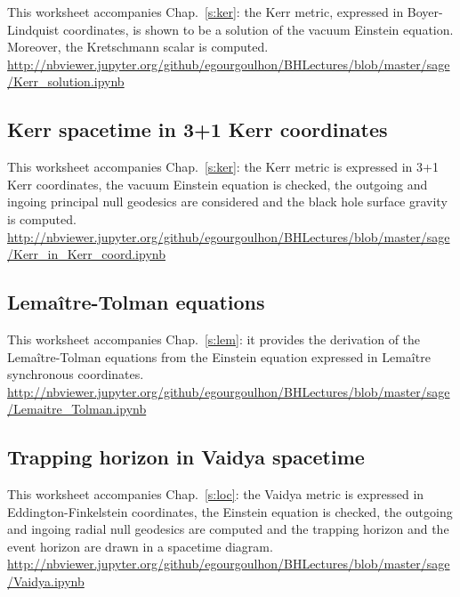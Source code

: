 This worksheet accompanies Chap.~\ref{s:ker}: the Kerr metric, expressed in Boyer-Lindquist
coordinates, is shown to be a solution of the vacuum Einstein equation. Moreover, the Kretschmann scalar is computed.\\[1ex]
{\footnotesize
\url{http://nbviewer.jupyter.org/github/egourgoulhon/BHLectures/blob/master/sage/Kerr_solution.ipynb}
}

\subsection{Kerr spacetime in 3+1 Kerr coordinates} \label{s:sam:Kerr_Kerr_coord}

This worksheet accompanies Chap.~\ref{s:ker}: the Kerr metric is expressed in 3+1 Kerr coordinates, the vacuum Einstein equation is checked, the outgoing and ingoing principal null geodesics are considered and the black hole surface gravity is computed.\\[1ex]
{\footnotesize
\url{http://nbviewer.jupyter.org/github/egourgoulhon/BHLectures/blob/master/sage/Kerr_in_Kerr_coord.ipynb}
}

\subsection{Lemaître-Tolman equations} \label{s:sam:Lemaitre-Tolman}

This worksheet accompanies Chap.~\ref{s:lem}: it provides the derivation
of the Lemaître-Tolman equations from the Einstein equation expressed in
Lemaître synchronous coordinates.\\[1ex]
{\footnotesize
\url{http://nbviewer.jupyter.org/github/egourgoulhon/BHLectures/blob/master/sage/Lemaitre_Tolman.ipynb}
}

\subsection{Trapping horizon in Vaidya spacetime} \label{s:sam:Vaidya_trapping}

This worksheet accompanies Chap.~\ref{s:loc}: the Vaidya metric is expressed in  Eddington-Finkelstein coordinates, the Einstein equation is checked, the outgoing and ingoing radial null geodesics are computed and the trapping horizon and the event
horizon are drawn in a spacetime diagram. \\[1ex]
{\footnotesize
\url{http://nbviewer.jupyter.org/github/egourgoulhon/BHLectures/blob/master/sage/Vaidya.ipynb}
}
